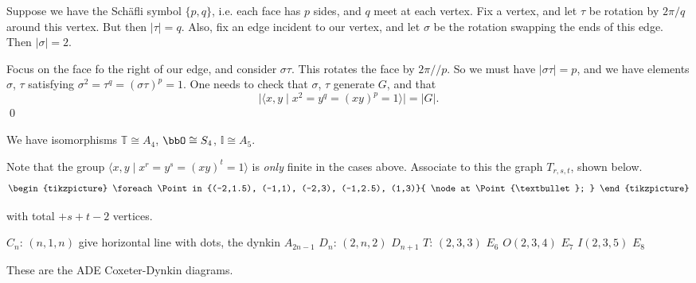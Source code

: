 \pfsk Suppose we have the Sch\"afli symbol $\{p,q\}$, i.e. each face has $p$ sides, and $q$ meet at each vertex. Fix a vertex, and let $\tau$ be rotation by $2\pi/q$ around this vertex. But then $|\tau|=q$. Also, fix an edge incident to our vertex, and let $\sigma$ be the rotation swapping the ends of this edge. Then $|\sigma|=2$. 


Focus on the face fo the right of our edge, and consider $\sigma\tau$. This rotates the face by $2\pi//p$. So we must have $|\sigma\tau|=p$, and we have elements $\sigma$, $\tau$ satisfying $\sigma^2=\tau^q=(\sigma\tau)^p=1$. One needs to check that $\sigma$, $\tau$ generate $G$, and that
	\[
	|\langle x,y \;|\; x^2=y^q=(xy)^p=1 \rangle| = |G|.
	\]
\qed \\

 
\begin{cor}
We have isomorphisms $\mathbb{T} \cong A_4$, $\bbO \cong S_4$, $\mathbb{I} \cong A_5$. 
\end{cor}

 Note that the group $\langle x,y \;|\; x^r=y^s=(xy)^t=1\rangle$ is \emph{only} finite in the cases above. Associate to this the graph $T_{r,s,t}$, shown below.
 	\[
	\begin{tikzpicture}
	\foreach \Point in {(-2,1.5), (-1,1), (-2,3), (-1,2.5), (1,3)}{
    \node at \Point {\textbullet};
}
	\end{tikzpicture}
	\]

with total $+s+t-2$ vertices. 

$C_n$: $(n,1,n)$ give horizontal line with dots, the dynkin $A_{2n-1}$
$D_n$: $(2,n,2)$  $D_{n+1}$
$T$: $(2,3,3)$ $E_6$
$O(2,3,4)$ $E_7$
$I(2,3,5)$ $E_8$

These are the ADE Coxeter-Dynkin diagrams. 














